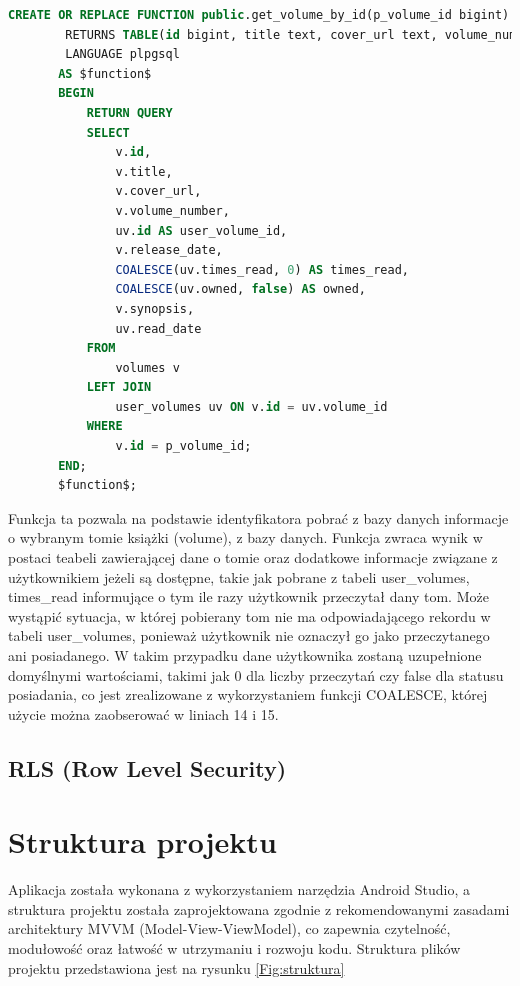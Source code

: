 \documentclass[12pt,twoside]{article}
\begin{document}
	\begin{lstlisting}[language=SQL,caption=kod funkcji get\_volume\_by\_id, label={sqlFunction}]
		CREATE OR REPLACE FUNCTION public.get_volume_by_id(p_volume_id bigint)
		RETURNS TABLE(id bigint, title text, cover_url text, volume_number smallint, user_volume_id bigint, release_date timestamp with time zone, times_read smallint, owned boolean, synopsis text, read_date timestamp with time zone)
		LANGUAGE plpgsql
	   AS $function$
	   BEGIN
		   RETURN QUERY
		   SELECT 
			   v.id,
			   v.title,
			   v.cover_url,
			   v.volume_number,
			   uv.id AS user_volume_id,
			   v.release_date,
			   COALESCE(uv.times_read, 0) AS times_read,
			   COALESCE(uv.owned, false) AS owned,
			   v.synopsis,
			   uv.read_date
		   FROM 
			   volumes v
		   LEFT JOIN 
			   user_volumes uv ON v.id = uv.volume_id
		   WHERE 
			   v.id = p_volume_id;
	   END;
	   $function$;
	\end{lstlisting}
Funkcja ta pozwala na podstawie identyfikatora pobrać z bazy danych informacje o wybranym tomie książki (volume), z bazy
danych. Funkcja zwraca wynik w postaci teabeli zawierającej dane o tomie oraz dodatkowe informacje związane z użytkownikiem
jeżeli są dostępne, takie jak pobrane z tabeli user\_volumes, times\_read informujące o tym ile razy użytkownik przeczytał
dany tom. Może wystąpić sytuacja, w której pobierany tom nie ma odpowiadającego rekordu w tabeli user\_volumes, ponieważ 
użytkownik nie oznaczył go jako przeczytanego ani posiadanego. W takim przypadku dane użytkownika zostaną uzupełnione 
domyślnymi wartościami, takimi jak 0 dla liczby przeczytań czy false dla statusu posiadania, co jest zrealizowane z 
wykorzystaniem funkcji COALESCE, której użycie można zaobserować w liniach 14 i 15.

\subsection{RLS (Row Level Security)}

\clearpage

\section{Struktura projektu}

Aplikacja została wykonana z wykorzystaniem narzędzia Android Studio, a struktura projektu została zaprojektowana 
zgodnie z rekomendowanymi zasadami architektury MVVM (Model-View-ViewModel), co zapewnia czytelność, modułowość
oraz łatwość w utrzymaniu i rozwoju kodu. Struktura plików projektu przedstawiona jest na rysunku \ref{Fig:struktura}
\end{document}
